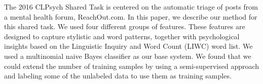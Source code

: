 The 2016 CLPsych Shared Task is centered on the automatic triage of posts from a mental health forum, ReachOut.com. In this paper, we describe our method for this shared task. We used four different groups of features. These features are designed to capture stylistic and word patterns, together with psychological insights based on the  Linguistic Inquiry and Word Count (LIWC) word list.  We used a multinomial naive Bayes classifier as our base system. We found that we could extend the number of training samples by using a semi-supervised approach and labeling some of the unlabeled data to use them as training samples.
